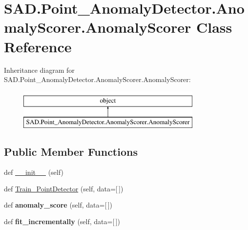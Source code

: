 \hypertarget{classSAD_1_1Point__AnomalyDetector_1_1AnomalyScorer_1_1AnomalyScorer}{}\section{S\+A\+D.\+Point\+\_\+\+Anomaly\+Detector.\+Anomaly\+Scorer.\+Anomaly\+Scorer Class Reference}
\label{classSAD_1_1Point__AnomalyDetector_1_1AnomalyScorer_1_1AnomalyScorer}
Inheritance diagram for S\+A\+D.\+Point\+\_\+\+Anomaly\+Detector.\+Anomaly\+Scorer.\+Anomaly\+Scorer\+:\begin{figure}[H]
\begin{center}
\leavevmode
\includegraphics[height=2.000000cm]{classSAD_1_1Point__AnomalyDetector_1_1AnomalyScorer_1_1AnomalyScorer}
\end{center}
\end{figure}
\subsection*{Public Member Functions}
\begin{DoxyCompactItemize}
\item 
def \hyperlink{classSAD_1_1Point__AnomalyDetector_1_1AnomalyScorer_1_1AnomalyScorer_a4109f8186ad1aa9c28c2f12fcc36c714}{\+\_\+\+\_\+init\+\_\+\+\_\+} (self)
\item 
def \hyperlink{classSAD_1_1Point__AnomalyDetector_1_1AnomalyScorer_1_1AnomalyScorer_a22e40f7116e20bd61b81510970266151}{Train\+\_\+\+Point\+Detector} (self, data=\mbox{[}$\,$\mbox{]})
\item 
def {\bfseries anomaly\+\_\+score} (self, data=\mbox{[}$\,$\mbox{]})\hypertarget{classSAD_1_1Point__AnomalyDetector_1_1AnomalyScorer_1_1AnomalyScorer_a534fddddf6e7535e84e75eb484735ce4}{}\label{classSAD_1_1Point__AnomalyDetector_1_1AnomalyScorer_1_1AnomalyScorer_a534fddddf6e7535e84e75eb484735ce4}

\item 
def {\bfseries fit\+\_\+incrementally} (self, data=\mbox{[}$\,$\mbox{]})\hypertarget{classSAD_1_1Point__AnomalyDetector_1_1AnomalyScorer_1_1AnomalyScorer_ad548d5a669559ec4db2711b0328d5d17}{}\label{classSAD_1_1Point__AnomalyDetector_1_1AnomalyScorer_1_1AnomalyScorer_ad548d5a669559ec4db2711b0328d5d17}

\end{DoxyCompactItemize}


